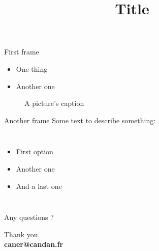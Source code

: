 %


\title[Subtitle]{Title}



\begin{frame}
  \titlepage
\end{frame}

\begin{frame}{First frame}
  \begin{itemize}
  \item One thing
  \item Another one
  \end{itemize}
  \begin{figure}[h]
    \centering
    \caption{A picture's caption}
  \end{figure}
\end{frame}

\begin{frame}{Another frame}
  Some text to describe something:
  \vspace{0.5cm}
  \begin{columns}[c]
    \column{1.0in}
    \begin{itemize}
    \item First option
    \item Another one
    \item And a last one
    \end{itemize}
    \column{2in}
    \framebox{
    }
  \end{columns}
\end{frame}

\begin{frame}{Any questions ?}

  \begin{center}
    Thank you.\\
    {\bf caner@candan.fr}
  \end{center}

\end{frame}


